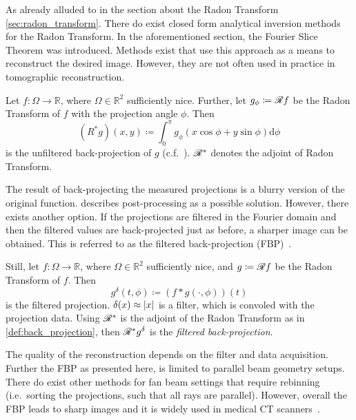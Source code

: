 As already alluded to in the section about the Radon Transform \ref{sec:radon_transform}. There do
exist closed form analytical inversion methods for the Radon Transform. In the aforementioned
section, the Fourier Slice Theorem was introduced. Methods exist that use this approach as a means
to reconstruct the desired image. However, they are not often used in practice in tomographic
reconstruction.

\begin{definition}\label{def:back_projection}
	Let \(f\colon \Omega \to \mathbb{R}\), where \(\Omega \in \mathbb{R}^2\) sufficiently nice.
	Further, let \(g_\phi \coloneq \mathscr{R} f\) be the Radon Transform of \(f\) with the
	projection angle \(\phi\). Then
	\[ (R^\ast g)(x, y) \coloneq \int_0^\pi g_\phi(x\cos \phi + y \sin\phi) \mathrm{d}\phi \]
	is the unfiltered back-projection of \(g\) (c.f.~\cite{buzug_computed_2008}).
	\(\mathscr{R}^\ast\) denotes the adjoint of Radon Transform.
\end{definition}


The result of back-projecting the measured projections is a blurry version of the original function.
\citeauthor{buzug_computed_2008} describes post-processing as a possible solution. However, there
exists another option. If the projections are filtered in the Fourier domain and then the filtered
values are back-projected just as before, a sharper image can be obtained. This is referred to as
the filtered back-projection (FBP)~\cite{ramachandran_three-dimensional_1971}.

\begin{definition}\label{def:filtered_back_projection}
	Still, let \(f\colon \Omega \to \mathbb{R}\), where \(\Omega \in \mathbb{R}^2\) sufficiently
	nice, and \(g \coloneq \mathscr{R} f\) be the Radon Transform of \(f\). Then
	\[ g^\delta(t, \phi) \coloneq (f \ast g(\cdot, \phi))(t) \]
	is the filtered projection. \(\delta(x) \approx \lvert x\rvert\) is a filter, which is convoled
	with the projection data. Using \(\mathscr{R}^\ast\) is the adjoint of the Radon Transform
	as in \autoref{def:back_projection}, then \(\mathscr{R}^\ast g^\delta\) is the
	\textit{filtered back-projection}.
\end{definition}

The quality of the reconstruction depends on the filter and data acquisition. Further the FBP as
presented here, is limited to parallel beam geometry setups. There do exist other methods for fan
beam settings that require rebinning (i.e.\ sorting the projections, such that all rays are
parallel). However, overall the FBP leads to sharp images and it is widely used in medical CT
scanners~\cite{pan_why_2009}.

